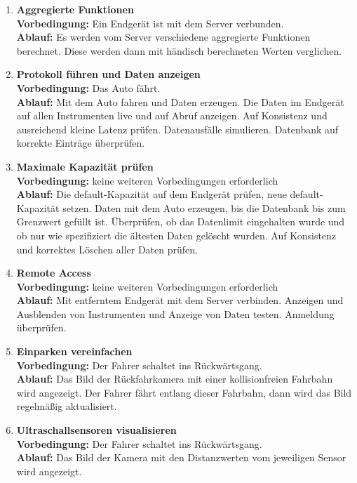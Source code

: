 \documentclass[pflichtenheft.tex]{subfiles}
\begin{document}
\begin{enumerate}
\item{\textbf{Aggregierte Funktionen}} \\
\textbf{Vorbedingung: } Ein Endgerät ist mit dem Server verbunden. \\ 
\textbf{Ablauf: } Es werden vom Server verschiedene aggregierte Funktionen berechnet. Diese werden dann mit händisch berechneten Werten verglichen.

\item{\textbf{Protokoll führen und Daten anzeigen}} \\
\textbf{Vorbedingung: } Das Auto fährt. \\
\textbf{Ablauf: } Mit dem Auto fahren und Daten erzeugen. Die Daten im Endgerät auf allen Instrumenten live und auf Abruf anzeigen. Auf Konsistenz und ausreichend kleine Latenz prüfen. Datenausfälle simulieren. Datenbank auf korrekte Einträge überprüfen.

\item{\textbf{Maximale Kapazität prüfen}} \\
\textbf{Vorbedingung: } keine weiteren Vorbedingungen erforderlich \\
\textbf{Ablauf: } Die default-Kapazität auf dem Endgerät prüfen, neue default-Kapazität setzen. Daten mit dem Auto erzeugen, bis die Datenbank bis zum Grenzwert gefüllt ist. Überprüfen, ob das Datenlimit eingehalten wurde und ob nur wie spezifiziert die ältesten Daten gelöscht wurden. Auf Konsistenz und korrektes Löschen aller Daten prüfen.

\item{\textbf{Remote Access}} \\
\textbf{Vorbedingung: } keine weiteren Vorbedingungen erforderlich \\
\textbf{Ablauf: } Mit entferntem Endgerät mit dem Server verbinden. Anzeigen und Ausblenden von Instrumenten und Anzeige von Daten testen. Anmeldung überprüfen.

\item{\textbf{Einparken vereinfachen}} \\
\textbf{Vorbedingung: } Der Fahrer schaltet ins Rückwärtsgang. \\
\textbf{Ablauf: } Das Bild der Rückfahrkamera mit einer kollisionfreien
Fahrbahn wird angezeigt. Der Fahrer fährt entlang dieser Fahrbahn, dann wird das
Bild regelmäßig aktualisiert.

\item{\textbf{Ultraschallsensoren visualisieren}} \\
\textbf{Vorbedingung: } Der Fahrer schaltet ins Rückwärtsgang. \\
\textbf{Ablauf: } Das Bild der Kamera mit den Distanzwerten vom jeweiligen
Sensor wird angezeigt.


\end{enumerate}
\end{document}
